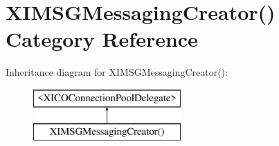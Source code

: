 \hypertarget{category_x_i_m_s_g_messaging_creator_07_08}{}\section{X\+I\+M\+S\+G\+Messaging\+Creator() Category Reference}
\label{category_x_i_m_s_g_messaging_creator_07_08}
Inheritance diagram for X\+I\+M\+S\+G\+Messaging\+Creator()\+:\begin{figure}[H]
\begin{center}
\leavevmode
\includegraphics[height=2.000000cm]{category_x_i_m_s_g_messaging_creator_07_08}
\end{center}
\end{figure}

